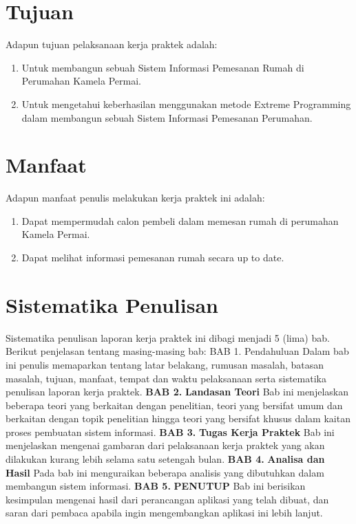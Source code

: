 \documentclass[12pt, a4paper, onecolumn, oneside, final]{report}
\begin{document}
\section{Tujuan}
\par  Adapun tujuan pelaksanaan kerja praktek adalah:
\begin{enumerate}
\item \par Untuk membangun sebuah Sistem Informasi Pemesanan Rumah di Perumahan Kamela Permai.

\item \par Untuk mengetahui keberhasilan menggunakan metode Extreme Programming dalam membangun sebuah Sistem Informasi Pemesanan Perumahan.

\end{enumerate}
\section{Manfaat}
\par  Adapun manfaat penulis melakukan kerja praktek ini adalah:
\begin{enumerate}
\item \par Dapat mempermudah calon pembeli dalam memesan rumah di perumahan Kamela Permai.

\item \par Dapat melihat informasi pemesanan rumah secara up to date.

\end{enumerate}
\section{Sistematika Penulisan}
\par  Sistematika penulisan laporan kerja praktek ini dibagi menjadi 5 (lima) bab. Berikut penjelasan tentang masing-masing bab: BAB 1. Pendahuluan Dalam bab ini penulis memaparkan tentang latar belakang, rumusan masalah, batasan masalah, tujuan, manfaat, tempat dan waktu pelaksanaan serta sistematika penulisan laporan kerja praktek. \textbf{BAB 2. }\textbf{Landasan Teori} Bab ini menjelaskan beberapa teori yang berkaitan dengan penelitian, teori yang bersifat umum dan berkaitan dengan topik penelitian hingga teori yang bersifat khusus dalam kaitan proses pembuatan sistem informasi. \textbf{BAB 3. }\textbf{Tugas Kerja Praktek} Bab ini menjelaskan mengenai gambaran dari pelaksanaan kerja praktek yang akan dilakukan kurang lebih selama satu setengah bulan. \textbf{BAB 4. }\textbf{Analisa dan Hasil} Pada bab ini menguraikan beberapa analisis yang dibutuhkan dalam membangun sistem informasi. \textbf{BAB 5. }\textbf{PENUTUP} Bab ini berisikan kesimpulan mengenai hasil dari perancangan aplikasi yang telah dibuat, dan saran dari pembaca apabila ingin mengembangkan aplikasi ini lebih lanjut.
\end{document}

